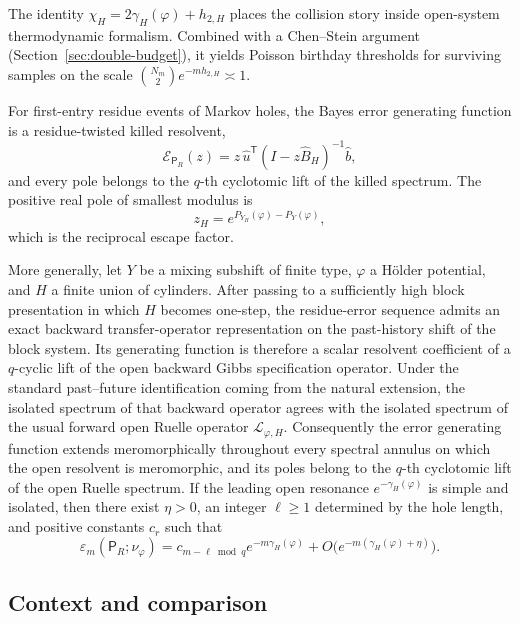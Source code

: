 The identity \(\chi_H = 2\gamma_H(\varphi)+h_{2,H}\) places the
collision story inside open-system thermodynamic formalism.  Combined
with a Chen--Stein argument (Section~\ref{sec:double-budget}), it yields
Poisson birthday thresholds for surviving samples on the scale
\(\binom{N_m}{2}e^{-m h_{2,H}}\asymp 1\).

\begin{theorem}
\label{thm:main-resonance}
For first-entry residue events of Markov holes, the Bayes error
generating function is a residue-twisted killed resolvent,
\[
  \mathcal E_{\mathsf P_R}(z)
  = z\,\widehat u^{\mathsf T}(I-z\widehat B_H)^{-1}\widehat b,
\]
and every pole belongs to the \(q\)-th cyclotomic lift of the killed
spectrum.  The positive real pole of smallest modulus is
\[
  z_H=e^{P_{Y_H}(\varphi)-P_Y(\varphi)},
\]
which is the reciprocal escape factor.

More generally, let \(Y\) be a mixing subshift of finite type,
\(\varphi\) a H\"older potential, and \(H\) a finite union of cylinders.
After passing to a sufficiently high block presentation in which \(H\)
becomes one-step, the residue-error sequence admits an exact backward
transfer-operator representation on the past-history shift of the block
system.  Its generating function is therefore a scalar resolvent
coefficient of a \(q\)-cyclic lift of the open backward Gibbs
specification operator.  Under the standard past--future identification
coming from the natural extension, the isolated spectrum of that
backward operator agrees with the isolated spectrum of the usual forward
open Ruelle operator \(\mathcal L_{\varphi,H}\).  Consequently the error
generating function extends meromorphically throughout every spectral
annulus on which the open resolvent is meromorphic, and its poles belong
to the \(q\)-th cyclotomic lift of the open Ruelle spectrum.  If the
leading open resonance \(e^{-\gamma_H(\varphi)}\) is simple and
isolated, then there exist \(\eta>0\), an integer
\(\ell\geq 1\) determined by the hole length, and positive constants
\(c_r\) such that
\[
  \varepsilon_m(\mathsf P_R;\nu_\varphi)
  = c_{m-\ell\bmod q}e^{-m\gamma_H(\varphi)}
    + O\bigl(e^{-m(\gamma_H(\varphi)+\eta)}\bigr).
\]
\end{theorem}

\subsection*{Context and comparison}

